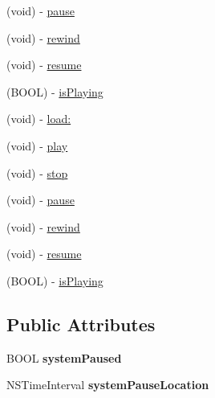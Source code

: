 \begin{DoxyCompactItemize}
\item 
(void) -\/ \hyperlink{interfaceCDLongAudioSource_a66db0e34e875823c4c0ea87b2036369c}{pause}
\item 
(void) -\/ \hyperlink{interfaceCDLongAudioSource_a2641a580b551bbd9e3ae8473af697284}{rewind}
\item 
(void) -\/ \hyperlink{interfaceCDLongAudioSource_a0cbc59ea523580c5e5338063b7a0df5f}{resume}
\item 
(B\+O\+OL) -\/ \hyperlink{interfaceCDLongAudioSource_a555f3c24d76f6e4d23bd809c2d064994}{is\+Playing}
\item 
(void) -\/ \hyperlink{interfaceCDLongAudioSource_a50cff2f77f96cf9a2655d5e18af9f225}{load\+:}
\item 
(void) -\/ \hyperlink{interfaceCDLongAudioSource_a2e2e9ba6cb50860a4ef8e310dc8eab65}{play}
\item 
(void) -\/ \hyperlink{interfaceCDLongAudioSource_ae77879d7c0e770cf58f8b8fb27cc29d4}{stop}
\item 
(void) -\/ \hyperlink{interfaceCDLongAudioSource_a66db0e34e875823c4c0ea87b2036369c}{pause}
\item 
(void) -\/ \hyperlink{interfaceCDLongAudioSource_a2641a580b551bbd9e3ae8473af697284}{rewind}
\item 
(void) -\/ \hyperlink{interfaceCDLongAudioSource_a0cbc59ea523580c5e5338063b7a0df5f}{resume}
\item 
(B\+O\+OL) -\/ \hyperlink{interfaceCDLongAudioSource_a555f3c24d76f6e4d23bd809c2d064994}{is\+Playing}
\end{DoxyCompactItemize}
\subsection*{Public Attributes}
\begin{DoxyCompactItemize}
\item 
\mbox{\label{interfaceCDLongAudioSource_a0b3ae1b0fd9e1c07e45cf0d42dc9da99}} 
B\+O\+OL {\bfseries system\+Paused}
\item 
\mbox{\label{interfaceCDLongAudioSource_a8955dbe7f4db7914793b01adab5cb23e}} 
N\+S\+Time\+Interval {\bfseries system\+Pause\+Location}
\end{DoxyCompactItemize}
